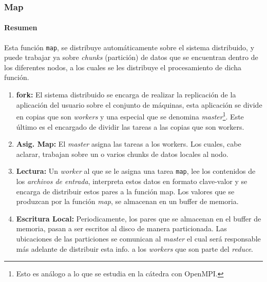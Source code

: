 \subsubsection{Map}
\label{sssec:map}

\paragraph{Resumen} Esta función {\tt map}, se distribuye automáticamente sobre el sistema
distribuido, y puede trabajar ya sobre {\it chunks} (partición) de datos
que se encuentran dentro de los diferentes nodos, a los cuales se les distribuye el
procesamiento de dicha función. 



\begin{enumerate}
\item {\bf fork:} El sistema distribuido se encarga de realizar la replicación
      de la aplicación del usuario sobre el conjunto de máquinas, esta
      aplicación se divide en copias que son {\it workers} y una especial que
      se denomina {\it master}\footnote{Esto es análogo a lo que se estudia en
      la cátedra con OpenMPI.}. Este último es el encargado de dividir las
      tareas a las copias que son workers.
\item {\bf Asig. Map:} El {\it master} asigna las tareas a los workers. Los
      cuales, cabe aclarar, trabajan sobre un o varios chunks de datos locales al
      nodo.
\item {\bf Lectura:} Un {\it worker} al que se le asigna una tarea {\tt map},
      lee los contenidos de los {\it archivos de entrada}, interpreta estos
      datos en formato clave-valor y se encarga de distribuir estos pares a la
      función {map}. Los valores que se produzcan por la función {\it map}, 
      se almacenan en un buffer de memoria.
\item {\bf Escritura Local:} Periodicamente, los pares que se almacenan en el
      buffer de memoria, pasan a ser escritos al disco de manera particionada. Las 
      ubicaciones de las particiones se comunican al {\it master} el cual será
      responsable más adelante de distribuir esta info. a los {\it workers} que
      son parte del {\it reduce}.
\end{enumerate}

